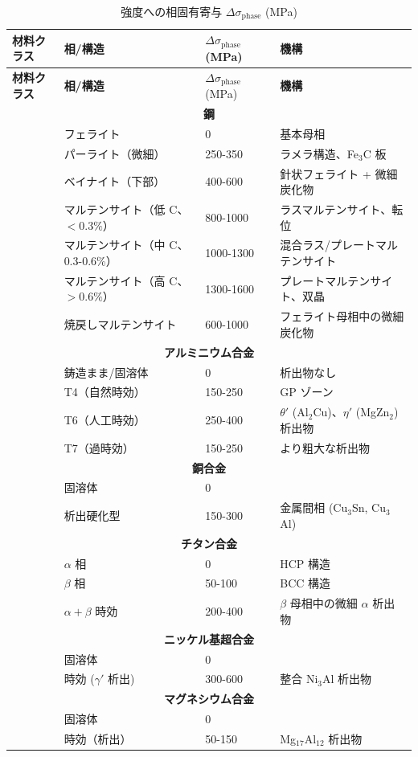 \documentclass[11pt,a4paper]{article}
\theoremstyle{remark}
\begin{document}
	\begin{longtable}{p{3.5cm}p{3.0cm}p{3.0cm}p{4cm}}
		\caption{強度への相固有寄与 \(\Delta\sigma_{\text{phase}}\) (MPa)} \label{tab:phase-contributions} \\
		\toprule
		\textbf{材料クラス} & \textbf{相/構造} & \(\Delta\sigma_{\text{phase}}\) (MPa) & \textbf{機構} \\
		\midrule
		\endfirsthead
		\toprule
		\textbf{材料クラス} & \textbf{相/構造} & \(\Delta\sigma_{\text{phase}}\) (MPa) & \textbf{機構} \\
		\midrule
		\endhead
		\multicolumn{4}{c}{\textbf{鋼}} \\
		& フェライト & 0 & 基本母相 \\
		& パーライト（微細） & 250-350 & ラメラ構造、Fe\(_3\)C 板 \\
		& ベイナイト（下部） & 400-600 & 針状フェライト + 微細炭化物 \\
		& マルテンサイト（低 C、\(<0.3\%\)） & 800-1000 & ラスマルテンサイト、転位 \\
		& マルテンサイト（中 C、0.3-0.6\%） & 1000-1300 & 混合ラス/プレートマルテンサイト \\
		& マルテンサイト（高 C、\(>0.6\%\)） & 1300-1600 & プレートマルテンサイト、双晶 \\
		& 焼戻しマルテンサイト & 600-1000 & フェライト母相中の微細炭化物 \\
		\hline
		\multicolumn{4}{c}{\textbf{アルミニウム合金}} \\
		& 鋳造まま/固溶体 & 0 & 析出物なし \\
		& T4（自然時効） & 150-250 & GP ゾーン \\
		& T6（人工時効） & 250-400 & \(\theta'\) (Al\(_2\)Cu)、\(\eta'\) (MgZn\(_2\)) 析出物 \\
		& T7（過時効） & 150-250 & より粗大な析出物 \\
		\hline
		\multicolumn{4}{c}{\textbf{銅合金}} \\
		& 固溶体 & 0 & \\
		& 析出硬化型 & 150-300 & 金属間相 (Cu\(_3\)Sn, Cu\(_3\)Al) \\
		\hline
		\multicolumn{4}{c}{\textbf{チタン合金}} \\
		& \(\alpha\) 相 & 0 & HCP 構造 \\
		& \(\beta\) 相 & 50-100 & BCC 構造 \\
		& \(\alpha+\beta\) 時効 & 200-400 & \(\beta\) 母相中の微細 \(\alpha\) 析出物 \\
		\hline
		\multicolumn{4}{c}{\textbf{ニッケル基超合金}} \\
		& 固溶体 & 0 & \\
		& 時効 (\(\gamma'\) 析出) & 300-600 & 整合 Ni\(_3\)Al 析出物 \\
		\hline
		\multicolumn{4}{c}{\textbf{マグネシウム合金}} \\
		& 固溶体 & 0 & \\
		& 時効（析出） & 50-150 & Mg\(_{17}\)Al\(_{12}\) 析出物 \\
		\bottomrule
	\end{longtable}
	
\end{document}

